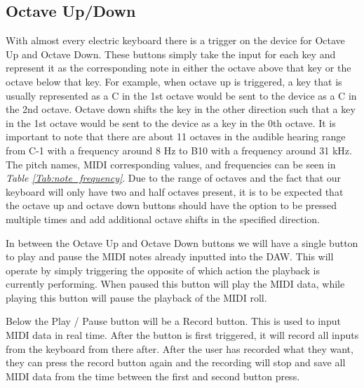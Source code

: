 \subsection{Octave Up/Down}

With almost every electric keyboard there is a trigger on the device for Octave Up and Octave Down. These buttons simply take the input for each key and represent it as the corresponding note in either the octave above that key or the octave below that key. For example, when octave up is triggered, a key that is usually represented as a C in the 1st octave would be sent to the device as a C in the 2nd octave. Octave down shifts the key in the other direction such that a key in the 1st octave would be sent to the device as a key in the 0th octave. It is important to note that there are about 11 octaves in the audible hearing range from C-1 with a frequency around 8 Hz to B10 with a frequency around 31 kHz. The pitch names, MIDI corresponding values, and frequencies can be seen in \textit{Table \ref{Tab:note_frequency}}. Due to the range of octaves and the fact that our keyboard will only have two and half octaves present, it is to be expected that the octave up and octave down buttons should have the option to be pressed multiple times and add additional octave shifts in the specified direction.

\begin{table}[]
  \centering
  \caption{}
  \label{Tab:note_frequency}
\end{table}

In between the Octave Up and Octave Down buttons we will have a single button to play and pause the MIDI notes already inputted into the DAW. This will operate by simply triggering the opposite of which action the playback is currently performing. When paused this button will play the MIDI data, while playing this button will pause the playback of the MIDI roll.

Below the Play / Pause button will be a Record button. This is used to input MIDI data in real time. After the button is first triggered, it will record all inputs from the keyboard from there after. After the user has recorded what they want, they can press the record button again and the recording will stop and save all MIDI data from the time between the first and second button press.

